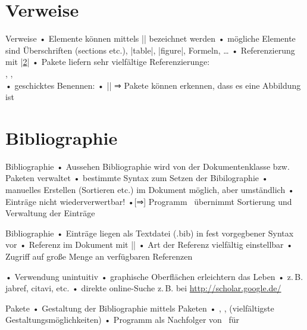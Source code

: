 \section{Verweise}
\begin{frame}[fragile]{Verweise}
• Elemente können mittels |\label{}| bezeichnet werden
• mögliche Elemente sind Überschriften (sections etc.), |table|, |figure|, Formeln, …
• Referenzierung mit |\ref{}|
• Pakete liefern sehr vielfältige Referenzierunge:\\%
, , \\%
• geschicktes Benennen:
• |\label{fig:Haus}| ⇒ Pakete können erkennen, dass es eine Abbildung ist
\•
\end{frame}

\section{Bibliographie}
\begin{frame}[fragile]{Bibliographie}
\def\exclam{!}  %
• Aussehen Bibliographie wird von der Dokumentenklasse bzw. Paketen verwaltet
• bestimmte Syntax zum Setzen der Bibilographie
• manuelles Erstellen (Sortieren etc.) im Dokument möglich, aber umständlich
• Einträge nicht wiederverwertbar\exclam\pause
•[⇒] Programm \BibTeX\ übernimmt Sortierung und Verwaltung der Einträge
\•
\end{frame}

\begin{frame}[fragile]{Bibliographie}
• Einträge liegen als Textdatei (.bib) in fest vorgegbener Syntax vor
• Referenz im Dokument mit |\cite{mittelbach2004}|
• Art der Referenz vielfältig einstellbar
• Zugriff auf große Menge an verfügbaren Referenzen
\•
\end{frame}

\begin{frame}{\BibTeX}
• Verwendung unintuitiv
• graphische Oberflächen erleichtern das Leben
• z.\,B. jabref, citavi, etc.
• direkte online-Suche z.\,B. bei \url{http://scholar.google.de/}
\•
\end{frame}

\begin{frame}[fragile]{Pakete}
• Gestaltung der Bibliographie mittels Paketen
• , \pause,  (vielfältigste Gestaltungsmöglichkeiten)
• Programm  als Nachfolger von \BibTeX\ für 
\•
\end{frame}

